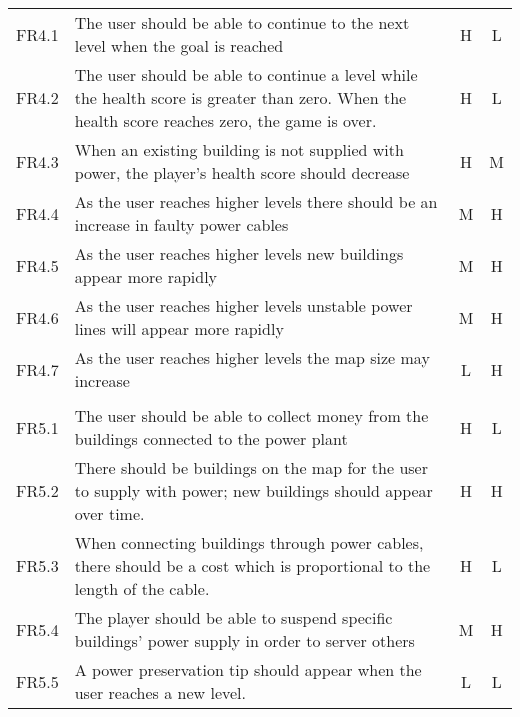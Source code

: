 \begin{longtable}{| c | p{8cm} | c | c |}
   	\rowcolor{Gray}
   	\multicolumn{4}{| l |}{4) Level specific} \\ \hline

   	FR4.1 & The user should be able to continue to the next level when the goal is reached & H & L \\ \hline

   	FR4.2 & The user should be able to continue a level while the health score is greater than zero. When the health score reaches zero, the game is over. & H & L \\ \hline

   	FR4.3 & When an existing building is not supplied with power, the player's health score should decrease & H & M \\ \hline

   	FR4.4 & As the user reaches higher levels there should be an increase in faulty power cables & M & H \\ \hline

   	FR4.5 & As the user reaches higher levels new buildings appear more rapidly & M & H \\ \hline

   	FR4.6 & As the user reaches higher levels unstable power lines will appear more rapidly & M & H \\ \hline

   	FR4.7 & As the user reaches higher levels the map size may increase & L & H \\ \hline

\pagebreak
   	\rowcolor{Gray}
   	\multicolumn{4}{| l |}{5) Incoming/outgoing money:} \\ \hline

   	FR5.1 & The user should be able to collect money from the buildings connected to the power plant & H & L \\ \hline

   	FR5.2 & There should be buildings on the map for the user to supply with power; new buildings should appear over time. & H & H \\ \hline

   	FR5.3 & When connecting buildings through power cables, there should be a cost which is proportional to the length of the cable. & H & L \\ \hline

   	FR5.4 & The player should be able to suspend specific buildings' power supply in order to server others & M & H \\ \hline

   	FR5.5 & A power preservation tip should appear when the user reaches a new level. & L & L \\ \hline


\end{longtable}
